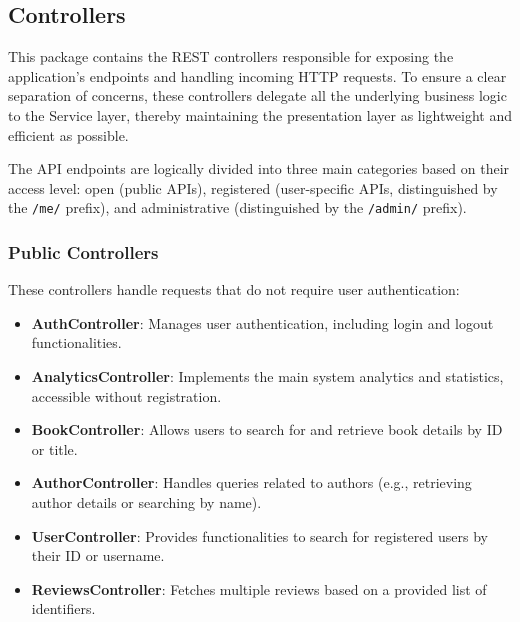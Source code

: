 \subsection{Controllers}
This package contains the REST controllers responsible for exposing the application's endpoints and handling incoming HTTP requests. To ensure a clear separation of concerns, these controllers delegate all the underlying business logic to the Service layer, thereby maintaining the presentation layer as lightweight and efficient as possible. 

The API endpoints are logically divided into three main categories based on their access level: open (public APIs), registered (user-specific APIs, distinguished by the \texttt{/me/} prefix), and administrative (distinguished by the \texttt{/admin/} prefix).

\subsubsection*{Public Controllers}
These controllers handle requests that do not require user authentication:
\begin{itemize}
    \item \textbf{AuthController}: Manages user authentication, including login and logout functionalities.
    \item \textbf{AnalyticsController}: Implements the main system analytics and statistics, accessible without registration.
    \item \textbf{BookController}: Allows users to search for and retrieve book details by ID or title.
    \item \textbf{AuthorController}: Handles queries related to authors (e.g., retrieving author details or searching by name).
    \item \textbf{UserController}: Provides functionalities to search for registered users by their ID or username.
    \item \textbf{ReviewsController}: Fetches multiple reviews based on a provided list of identifiers.
\end{itemize}

